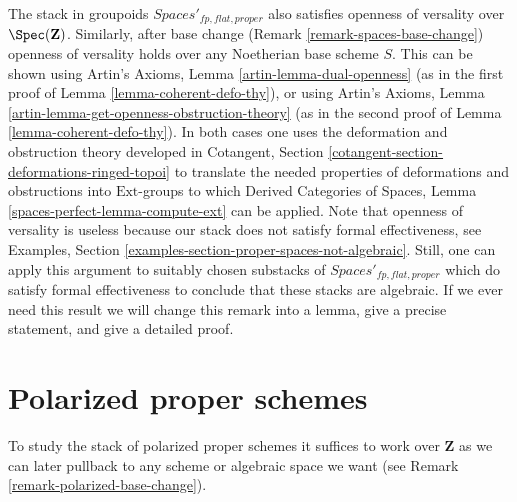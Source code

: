 \begin{remark}
\label{remark-spaces-defo-thy}
The stack in groupoids $\textit{Spaces}'_{fp, flat, proper}$
also satisfies openness of versality over $\Spec(\mathbf{Z})$.
Similarly, after base change (Remark \ref{remark-spaces-base-change})
openness of versality holds over any Noetherian base scheme $S$.
This can be shown using
Artin's Axioms, Lemma \ref{artin-lemma-dual-openness}
(as in the first proof of
Lemma \ref{lemma-coherent-defo-thy}), or using
Artin's Axioms, Lemma \ref{artin-lemma-get-openness-obstruction-theory}
(as in the second proof of
Lemma \ref{lemma-coherent-defo-thy}).
In both cases one uses the deformation and obstruction theory developed in
Cotangent, Section \ref{cotangent-section-deformations-ringed-topoi}
to translate the needed properties of deformations and obstructions
into $\text{Ext}$-groups to which
Derived Categories of Spaces, Lemma
\ref{spaces-perfect-lemma-compute-ext}
can be applied.
Note that openness of versality is useless because our stack
does not satisfy formal effectiveness, see
Examples, Section \ref{examples-section-proper-spaces-not-algebraic}.
Still, one can apply this argument to suitably chosen substacks
of $\textit{Spaces}'_{fp, flat, proper}$ which do satisfy
formal effectiveness to conclude that these stacks are algebraic.
If we ever need this result we will change this remark into a lemma,
give a precise statement, and give a detailed proof.
\end{remark}





\section{Polarized proper schemes}
\label{section-polarized}

\noindent
To study the stack of polarized proper schemes it suffices to work
over $\mathbf{Z}$ as we can later pullback to any scheme or algebraic
space we want (see Remark \ref{remark-polarized-base-change}).

